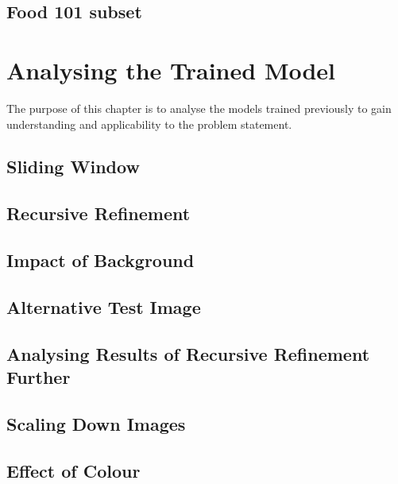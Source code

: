 \section{Food 101 subset}
\label{subset}


\chapter{Analysing the Trained Model}
The purpose of this chapter is to analyse the models trained previously to gain understanding and applicability to the problem statement.

\section{Sliding Window}
\label{slidingWindow}


\section{Recursive Refinement}
\label{RR}


\section{Impact of Background}
\label{background}


\section{Alternative Test Image}
\label{alternative}


\section{Analysing Results of Recursive Refinement Further}
\label{rrAnalyse}


\section{Scaling Down Images}
\label{scale}


\section{Effect of Colour}
\label{colour}


% 

